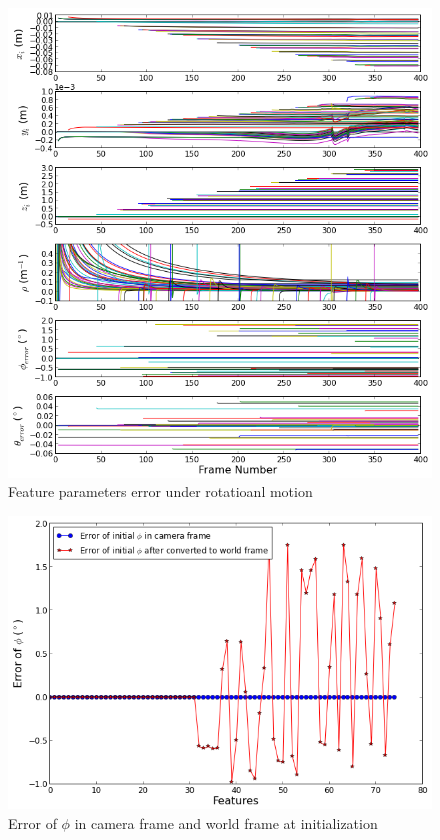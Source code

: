 \begin{figure}[h]
  \centering
  \includegraphics[scale=0.5]{./Figures/SimulationFigures/Figure25.png}
  \caption{Feature parameters error under rotatioanl motion}
  \label{fig:simfig25}
\end{figure}

\begin{figure}[h]
  \centering
  \includegraphics[scale=0.5]{./Figures/SimulationFigures/Figure26.png}
  \caption{Error of $\phi$ in camera frame and world frame at initialization}
  \label{fig:simfig26}
\end{figure}



